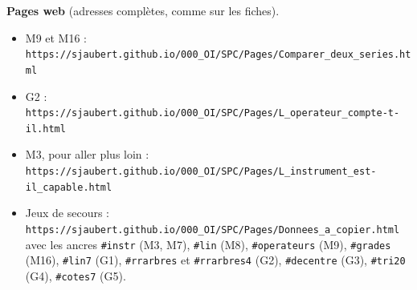 \documentclass[10pt,a4paper]{article}
\begin{document}
\par\smallskip
\textbf{Pages web} (adresses complètes, comme sur les fiches).
\begin{itemize}[leftmargin=14pt,itemsep=1pt]\footnotesize
\item M9 et M16 : \texttt{https://sjaubert.github.io/000\_OI/SPC/Pages/Comparer\_deux\_series.html}
\item G2 : \texttt{https://sjaubert.github.io/000\_OI/SPC/Pages/L\_operateur\_compte-t-il.html}
\item M3, pour aller plus loin : \texttt{https://sjaubert.github.io/000\_OI/SPC/Pages/L\_instrument\_est-il\_capable.html}
\item Jeux de secours : \texttt{https://sjaubert.github.io/000\_OI/SPC/Pages/Donnees\_a\_copier.html} avec les ancres \texttt{\#instr} (M3, M7), \texttt{\#lin} (M8), \texttt{\#operateurs} (M9), \texttt{\#grades} (M16), \texttt{\#lin7} (G1), \texttt{\#rrarbres} et \texttt{\#rrarbres4} (G2), \texttt{\#decentre} (G3), \texttt{\#tri20} (G4), \texttt{\#cotes7} (G5).
\end{itemize}
\end{document}

